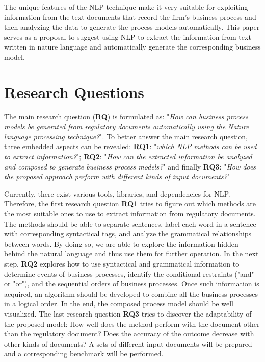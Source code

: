 	The unique features of the NLP technique make it very suitable for exploiting information from the text documents that record the firm's business process and then analyzing the data to generate the process models automatically. This paper serves as a proposal to suggest using NLP to extract the information from text written in nature language and automatically generate the corresponding business model.
	
	\section{Research Questions}
	\label{sec:rq}

	The main research question (\textbf{RQ}) is formulated as: "\textit{How can business process models be generated from regulatory documents automatically using the Nature language processing technique?}". To better answer the main research question, three embedded aspects can be revealed: \textbf{RQ1}: "\textit{which NLP methods can be used to extract information?}"; \textbf{RQ2}: "\textit{How can the extracted information be analyzed and composed to generate business process models?}" and finally \textbf{RQ3}: "\textit{How does the proposed approach perform with different kinds of input documents?}"

	
	Currently, there exist various tools, libraries, and dependencies for NLP. Therefore, the first research question \textbf{RQ1} tries to figure out which methods are the most suitable ones to use to extract information from regulatory documents. The methods should be able to separate sentences, label each word in a sentence with corresponding syntactical tags, and analyze the grammatical relationships between words. By doing so, we are able to explore the information hidden behind the natural language and thus use them for further operation. In the next step, \textbf{RQ2} explores how to use syntactical and grammatical information to determine events of business processes, identify the conditional restraints ("and" or "or"), and the sequential orders of business processes. Once such information is acquired, an algorithm should be developed to combine all the business processes in a logical order. In the end, the composed process model should be well visualized. The last research question \textbf{RQ3} tries to discover the adaptability of the proposed model: How well does the method perform with the document other than the regulatory document? Does the accuracy of the outcome decrease with other kinds of documents? A sets of different input documents will be prepared and a corresponding benchmark will be performed. 